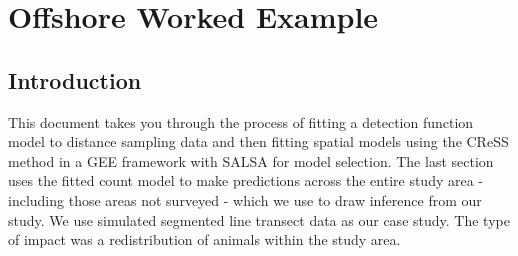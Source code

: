 %
%
%
%
%
%
%
%
%
%

\chapter{Offshore Worked Example}
\section{Introduction}

This document takes you through the process of fitting a detection function model to distance sampling data and then fitting spatial models using the CReSS method in a GEE framework with SALSA for model selection.  The last section uses the fitted count model to make predictions across the entire study area - including those areas not surveyed - which we use to draw inference from our study. We use simulated segmented line transect data as our case study. The type of impact was a redistribution of animals within the study area. 
